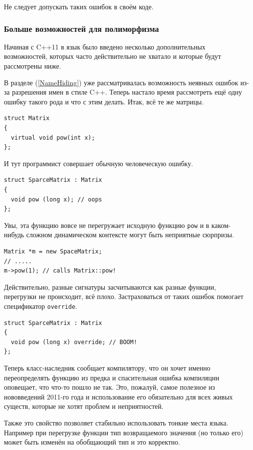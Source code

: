 \documentclass[a4paper,12pt,oneside]{article}
\begin{document}
Не следует допускать таких ошибок в своём коде.

\subsubsection{Больше возможностей для полиморфизма}\label{NewVirtual}

Начиная с C++11 в язык было введено несколько дополнительных возможностей, которых часто действительно не хватало и которые будут рассмотрены ниже.

В разделе (\ref{NameHiding}) уже рассматривалась возможность неявных ошибок из-за разрешения имен в стиле C++. Теперь настало время рассмотреть ещё одну ошибку такого рода и что с этим делать. Итак, всё те же матрицы.

\begin{lstlisting}
struct Matrix
{
  virtual void pow(int x);
};
\end{lstlisting}

И тут программист совершает обычную человеческую ошибку.

\begin{lstlisting}
struct SparceMatrix : Matrix
{
  void pow (long x); // oops
};
\end{lstlisting}

Увы, эта функцию вовсе не перегружает исходную функцию \lstinline!pow! и в каком-нибудь сложном динамическом контексте могут быть неприятные сюрпризы. 

\begin{lstlisting}
Matrix *m = new SpaceMatrix;
// .....
m->pow(1); // calls Matrix::pow!
\end{lstlisting}

Действительно, разные сигнатуры засчитываются как разные функции, перегрузки не происходит, всё плохо. Застраховаться от таких ошибок помогает спецификатор \lstinline!override!.

\begin{lstlisting}
struct SparceMatrix : Matrix
{
  void pow (long x) override; // BOOM!
};
\end{lstlisting}

Теперь класс-наследник сообщает компилятору, что он хочет именно переопределять функцию из предка и спасительная ошибка компиляции оповещает, что что-то пошло не так. Это, пожалуй, самое полезное из нововведений 2011-го года и использование его обязательно для всех живых существ, которые не хотят проблем и неприятностей.

Также это свойство позволяет стабильно использовать тонкие места языка. Например при перегрузке функции тип возвращаемого значения (но только его) может быть изменён на обобщающий тип и это корректно.
\end{document}
